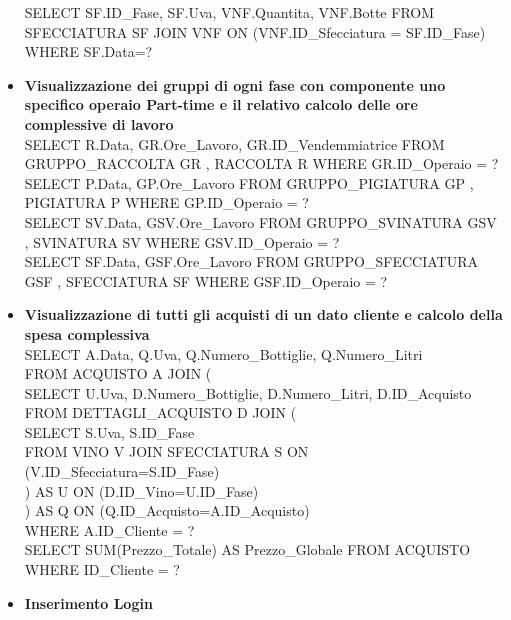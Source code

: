 \documentclass{article}
\begin{document}
\begin{itemize}
SELECT SF.ID\_Fase, SF.Uva, VNF.Quantita, VNF.Botte FROM SFECCIATURA SF JOIN VNF ON (VNF.ID\_Sfecciatura = SF.ID\_Fase) WHERE SF.Data=?\\\newline
\item \textbf{Visualizzazione dei gruppi di ogni fase con componente uno specifico operaio Part-time e il relativo calcolo delle ore complessive di lavoro }\\\newline
SELECT R.Data, GR.Ore\_Lavoro, GR.ID\_Vendemmiatrice FROM GRUPPO\_RACCOLTA GR , RACCOLTA R WHERE GR.ID\_Operaio = ?\\\newline
SELECT P.Data, GP.Ore\_Lavoro FROM GRUPPO\_PIGIATURA GP , PIGIATURA P WHERE GP.ID\_Operaio = ?\\\newline
SELECT SV.Data, GSV.Ore\_Lavoro FROM GRUPPO\_SVINATURA GSV , SVINATURA SV WHERE GSV.ID\_Operaio = ?\\\newline
SELECT SF.Data, GSF.Ore\_Lavoro FROM GRUPPO\_SFECCIATURA GSF , SFECCIATURA SF WHERE GSF.ID\_Operaio = ?\\\newline
\newpage
\item \textbf{Visualizzazione di tutti gli acquisti di un dato cliente  e calcolo della spesa complessiva }\\\newline
SELECT A.Data, Q.Uva, Q.Numero\_Bottiglie, Q.Numero\_Litri\\
FROM ACQUISTO A JOIN (\\
SELECT U.Uva, D.Numero\_Bottiglie, D.Numero\_Litri, D.ID\_Acquisto\\
FROM DETTAGLI\_ACQUISTO D JOIN (\\
SELECT S.Uva, S.ID\_Fase\\
FROM VINO V JOIN SFECCIATURA S ON (V.ID\_Sfecciatura=S.ID\_Fase)\\
) AS U ON (D.ID\_Vino=U.ID\_Fase)\\
) AS Q ON (Q.ID\_Acquisto=A.ID\_Acquisto)\\
WHERE A.ID\_Cliente = ?\\\newline
SELECT SUM(Prezzo\_Totale) AS Prezzo\_Globale  FROM ACQUISTO WHERE ID\_Cliente = ? \\\newline
\item \textbf{Inserimento Login}\\\newline

\end{itemize}
\end{document}

